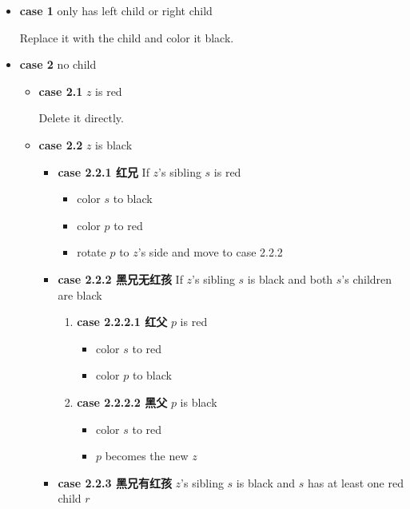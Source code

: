 \documentclass{article}
\begin{document}
\begin{itemize}
    \item \textbf{case 1} only has left child or right child\par
    Replace it with the child and color it black.
    \item \textbf{case 2} no child
        \begin{itemize}
            \item \textbf{case 2.1} $z$ is red\par
            Delete it directly.
            \item \textbf{case 2.2} $z$ is black
            \begin{itemize}
                \item \textbf{case 2.2.1 红兄}
                If $z$'s sibling $s$ is red 
                \begin{itemize}
                    \item color $s$ to black
                    \item color $p$ to red
                    \item rotate $p$ to $z$'s side and move to case 2.2.2
                \end{itemize}
                \item \textbf{case 2.2.2 黑兄无红孩}
                If $z$'s sibling $s$ is black and both $s$'s children are black
                \begin{enumerate}
                    \item \textbf{case 2.2.2.1 红父} $p$ is red
                    \begin{itemize}
                        \item color $s$ to red
                        \item color $p$ to black
                    \end{itemize}
                    \item \textbf{case 2.2.2.2 黑父} $p$ is black
                    \begin{itemize}
                        \item color $s$ to red
                        \item $p$ becomes the new $z$
                    \end{itemize}
                \end{enumerate}
                \item \textbf{case 2.2.3 黑兄有红孩} 
                $z$'s sibling $s$ is black and $s$ has at least one red child $r$

\end{itemize}
\end{itemize}
\end{itemize}
\end{document}
